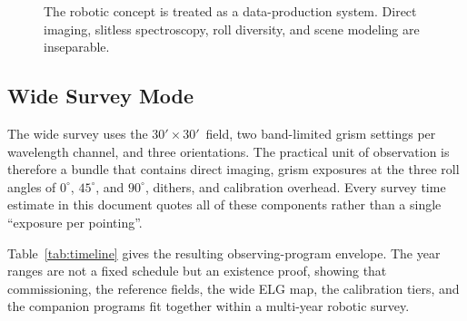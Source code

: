 \documentclass[10pt,onecolumn]{article}
\newcommand{\fovlarge}{$30'\!\times30'$}
\begin{document}
\begin{figure}[tp]
\centering
{}
\caption{The robotic concept is treated as a data-production system. Direct imaging, slitless spectroscopy, roll diversity, and scene modeling are inseparable.}
\label{fig:ops}
\end{figure}

\subsection{Wide Survey Mode}

The wide survey uses the \fovlarge\ field, two band-limited grism settings per wavelength channel, and three orientations. The practical unit of observation is therefore a bundle that contains direct imaging, grism exposures at the three roll angles of $0^\circ$, $45^\circ$, and $90^\circ$, dithers, and calibration overhead. Every survey time estimate in this document quotes all of these components rather than a single ``exposure per pointing''.

Table~\ref{tab:timeline} gives the resulting observing-program envelope. The year ranges are not a fixed schedule but an existence proof, showing that commissioning, the reference fields, the wide ELG map, the calibration tiers, and the companion programs fit together within a multi-year robotic survey.
\end{document}
